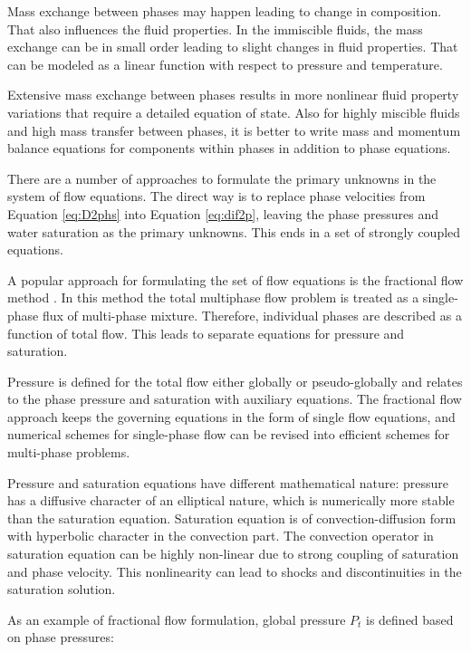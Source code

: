 Mass exchange between phases may happen leading to change in composition. That
also influences the fluid properties. In the immiscible fluids, the mass
exchange can be in small
order leading to slight changes in fluid properties. That can be modeled as a
linear function with respect to pressure and temperature. 
 
Extensive mass exchange between phases results in more nonlinear fluid property
variations that require a detailed equation of state. Also for highly miscible
fluids and high mass transfer between phases, it is better to write mass
and momentum balance equations for components within phases in addition to phase
equations.
 
There are a number of approaches to formulate the primary unknowns in the system
of
flow equations. The direct way is to replace phase velocities from Equation
\ref{eq:D2phs} into Equation \ref{eq:dif2p}, leaving the phase pressures and
water saturation as the primary unknowns. This ends in a set of strongly coupled
equations. 
 
A popular approach for formulating the set of flow equations is the fractional
flow method \cite{binning1999practical}. In this method the total multiphase
flow problem is treated as a
single-phase flux of multi-phase mixture. Therefore, individual phases are
described as a function of total flow. This leads to separate equations for
pressure and saturation. 
 
Pressure is defined for the total flow either globally or pseudo-globally and relates to the phase pressure and saturation with auxiliary
equations. The fractional flow approach keeps the governing equations in the
form of single flow equations, and numerical schemes for single-phase flow can
be revised into efficient schemes for multi-phase problems.
 
Pressure and saturation equations have different mathematical nature: pressure
has a diffusive character of an elliptical nature, which is numerically more
stable than the saturation equation. Saturation equation is of
convection-diffusion form with hyperbolic character in the convection part. The
convection operator in saturation equation can be highly non-linear due to
strong coupling of saturation and phase velocity. This nonlinearity can lead to
shocks and discontinuities in the saturation solution.
 
As an example of fractional flow formulation, global pressure $P_t$ is defined
based on phase pressures:
 
